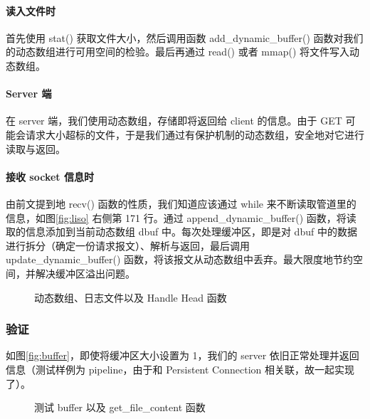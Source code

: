 \paragraph*{读入文件时} 首先使用 stat() 获取文件大小，然后调用函数 add\_dynamic\_buffer() 函数对我们的动态数组进行可用空间的检验。最后再通过 read() 或者 mmap() 将文件写入动态数组。

\paragraph*{Server 端} 在 server 端，我们使用动态数组，存储即将返回给 client 的信息。由于 GET 可能会请求大小超标的文件，于是我们通过有保护机制的动态数组，安全地对它进行读取与返回。

\paragraph*{接收 socket 信息时} 由前文提到地 recv() 函数的性质，我们知道应该通过 while 来不断读取管道里的信息，如图\ref{fig:liso} 右侧第 171 行。通过 append\_dynamic\_buffer() 函数，将读取的信息添加到当前动态数组 dbuf 中。每次处理缓冲区，即是对 dbuf 中的数据进行拆分（确定一份请求报文）、解析与返回，最后调用 update\_dynamic\_buffer() 函数，将该报文从动态数组中丢弃。最大限度地节约空间，并解决缓冲区溢出问题。
\begin{figure}[htbp!]
    \centering
    \caption{动态数组、日志文件以及 Handle Head 函数}\label{fig:Chapter2}
\end{figure}

\subsubsection*{验证}
如图\ref{fig:buffer}，即使将缓冲区大小设置为 1，我们的 server 依旧正常处理并返回信息（测试样例为 pipeline，由于和 Persistent Connection 相关联，故一起实现了）。
\begin{figure}[htbp!]
    \centering
    \subfigure[buffer\_test,BUF\_SIZE=1]{\label{fig:buffer}\texttt{[image: BUF=1.png]}}
    \caption{测试 buffer 以及 get\_file\_content 函数}\label{fig:Chapter2.2}
\end{figure}


